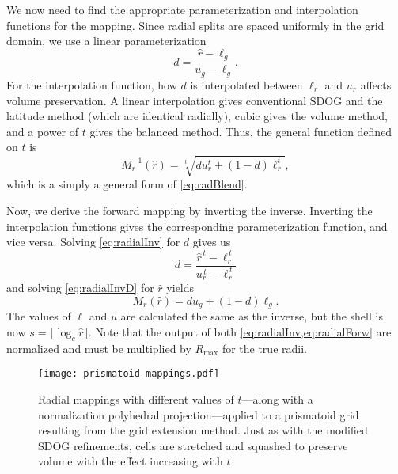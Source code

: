 We now need to find the appropriate parameterization and interpolation functions for the mapping.
Since radial splits are spaced uniformly in the grid domain, we use a linear parameterization
%
\begin{equation} \label{eq:radialInvD}
d = \frac{ \hat{r} - \ell_g }{ u_g - \ell_g }.
\end{equation}
%
For the interpolation function, how $d$ is interpolated between $\ell_r$ and $u_r$ affects volume preservation.
A linear interpolation gives conventional SDOG and the latitude method (which are identical radially), cubic gives the volume method, and a power of $t$ gives the balanced method.
Thus, the general function defined on $t$ is
%
\begin{equation} \label{eq:radialInv}
M_r^{-1}(\hat{r}) = \sqrt[t]{ d u_r^{t} + \left( 1 - d \right) \ell_r^{t} },
\end{equation}
%
which is a simply a general form of \cref{eq:radBlend}.


Now, we derive the forward mapping by inverting the inverse.
Inverting the interpolation functions gives the corresponding parameterization function, and vice versa.
Solving \cref{eq:radialInv} for $d$ gives us
%
\begin{equation} \label{eq:radialForwD}
d = \frac{ \hat{r}^{\,t} - \ell_r^{\,t} }{ u_r^{\,t} - \ell_r^{\,t} }
\end{equation}
%
and solving \cref{eq:radialInvD} for $\hat{r}$ yields
%
\begin{equation} \label{eq:radialForw}
M_r (\hat{r}) = d u_g + \left( 1 - d \right) \ell_g.
\end{equation}
%
The values of $\ell$ and $u$ are calculated the same as the inverse, but the shell is now $s = \lfloor \log_{c} \hat{r} \rfloor$.
Note that the output of both \cref{eq:radialInv,eq:radialForw} are normalized and must be multiplied by $R_\mathrm{max}$ for the true radii.


\begin{figure}[ht!]
	\centering
	\texttt{[image: prismatoid-mappings.pdf]}
	\caption[Radial mappings applied to the grid extension method]{
		Radial mappings with different values of $t$---along with a normalization polyhedral projection---applied to a prismatoid grid resulting from the grid extension method.
		Just as with the modified SDOG refinements, cells are stretched and squashed to preserve volume with the effect increasing with $t$
	}
	\label{fig:prismatoid-mappings}
\end{figure}


